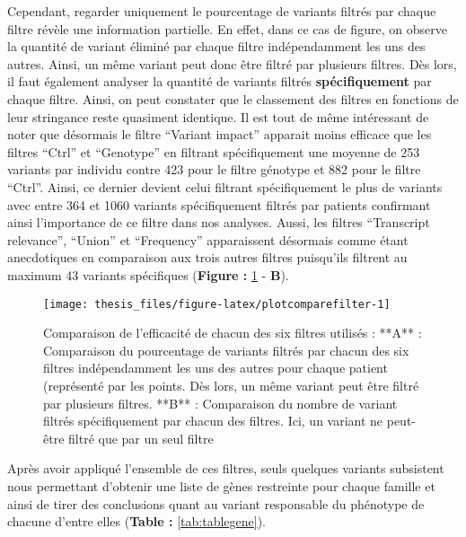 \documentclass[12pt,twoside]{reedthesis}
\theoremstyle{definition}
\theoremstyle{definition}
\theoremstyle{remark}
\begin{document}
  Cependant, regarder uniquement le pourcentage de variants filtrés par
  chaque filtre révèle une information partielle. En effet, dans ce cas de
  figure, on observe la quantité de variant éliminé par chaque filtre
  indépendamment les uns des autres. Ainsi, un même variant peut donc être
  filtré par plusieurs filtres. Dès lors, il faut également analyser la
  quantité de variants filtrés \textbf{spécifiquement} par chaque filtre.
  Ainsi, on peut constater que le classement des filtres en fonctions de
  leur stringance reste quasiment identique. Il est tout de même
  intéressant de noter que désormais le filtre ``Variant impact'' apparait
  moins efficace que les filtres ``Ctrl'' et ``Genotype'' en filtrant
  spécifiquement une moyenne de 253 variants par individu contre 423 pour
  le filtre génotype et 882 pour le filtre ``Ctrl''. Ainsi, ce dernier
  devient celui filtrant spécifiquement le plus de variants avec entre 364
  et 1060 variants spécifiquement filtrés par patients confirmant ainsi
  l'importance de ce filtre dans nos analyses. Aussi, les filtres
  ``Transcript relevance'', ``Union'' et ``Frequency'' apparaissent
  désormais comme étant anecdotiques en comparaison aux trois autres
  filtres puisqu'ils filtrent au maximum 43 variants spécifiques
  (\textbf{Figure :} \ref{fig:plotcomparefilter} - \textbf{B}).
  
  \newpage
  
  \begin{figure}
  
  {\centering \texttt{[image: thesis\_files/figure-latex/plotcomparefilter-1]} 
  
  }
  
  \caption[Comparaison de l'efficacité de chacun des six filtres utilisés]{Comparaison de l'efficacité de chacun des six filtres utilisés : **A** : Comparaison du pourcentage de variants filtrés par chacun des six filtres indépendamment les uns des autres pour chaque patient (représenté par les points. Dès lors, un même variant peut être filtré par plusieurs filtres. **B** : Comparaison du nombre de variant filtrés spécifiquement par chacun des filtres. Ici, un variant ne peut-être filtré que par un seul filtre}\label{fig:plotcomparefilter}
  \end{figure}
  
  \newpage
  
  Après avoir appliqué l'ensemble de ces filtres, seuls quelques variants
  subsistent nous permettant d'obtenir une liste de gènes restreinte pour
  chaque famille et ainsi de tirer des conclusions quant au variant
  responsable du phénotype de chacune d'entre elles (\textbf{Table :
  }\ref{tab:tablegene}).
  
\end{document}
